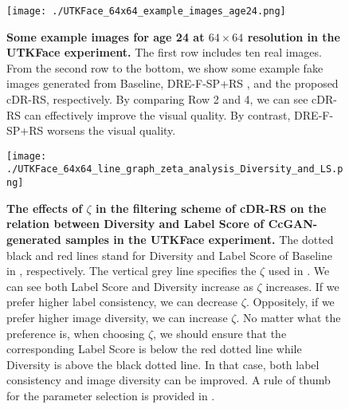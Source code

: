 \documentclass[final,12pt, 3p,times]{elsarticle}
\begin{document}
\begin{figure}[htbp]
	\centering
	\texttt{[image: ./UTKFace\_64x64\_example\_images\_age24.png]}  \caption{\textbf{Some example images for age 24 at $64\times 64$ resolution in the UTKFace experiment.} The first row includes ten real images. From the second row to the bottom, we show some example fake images generated from Baseline, DRE-F-SP+RS \cite{ding2020subsampling}, and the proposed cDR-RS, respectively. By comparing Row 2 and 4, we can see cDR-RS can effectively improve the visual quality. By contrast, DRE-F-SP+RS worsens the visual quality.}
	\label{fig:UTKFace_example_images}
\end{figure}

\begin{figure}[htbp]
	\centering
	\texttt{[image: ./UTKFace\_64x64\_line\_graph\_zeta\_analysis\_Diversity\_and\_LS.png]}  \caption{\textbf{The effects of $\zeta$ in the filtering scheme of cDR-RS on the relation between Diversity and Label Score of CcGAN-generated samples in the UTKFace experiment.} The dotted black and red lines stand for Diversity and Label Score of Baseline in , respectively. The vertical grey line specifies the $\zeta$ used in . We can see both Label Score and Diversity increase as $\zeta$ increases. If we prefer higher label consistency, we can decrease $\zeta$. Oppositely, if we prefer higher image diversity, we can increase $\zeta$. No matter what the preference is, when choosing $\zeta$, we should ensure that the corresponding Label Score is below the red dotted line while Diversity is above the black dotted line. In that case, both label consistency and image diversity can be improved. A rule of thumb for the parameter selection is provided in .}
	\label{fig:UTKFace_effect_of_kappa}
\end{figure}
\end{document}
